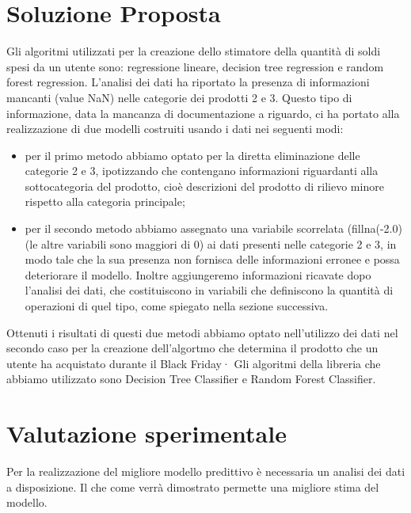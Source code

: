 \documentclass{article}
\begin{document}
\section{Soluzione Proposta}
Gli algoritmi utilizzati per la creazione dello stimatore della quantità di soldi spesi da un utente sono: regressione lineare, decision tree regression e random forest regression.
L'analisi dei dati ha riportato la presenza di informazioni mancanti (value NaN) nelle categorie dei prodotti 2 e 3. Questo tipo di informazione, data la mancanza di documentazione a riguardo, ci ha portato alla realizzazione di due modelli costruiti usando i dati nei seguenti modi:
\begin{itemize}
\item per il primo metodo abbiamo optato per la diretta eliminazione delle categorie 2 e 3, ipotizzando che contengano informazioni riguardanti alla sottocategoria del prodotto, cioè descrizioni del prodotto di rilievo minore rispetto alla categoria principale;
\item per il secondo metodo abbiamo assegnato una variabile scorrelata (fillna(-2.0) (le altre variabili sono maggiori di 0) ai dati presenti nelle categorie 2 e 3, in modo tale che la sua presenza non fornisca delle informazioni erronee e possa deteriorare il modello. Inoltre aggiungeremo informazioni ricavate dopo l'analisi dei dati, che costituiscono in variabili che definiscono la quantità di operazioni di quel tipo, come spiegato nella sezione successiva.
\end{itemize}

Ottenuti i risultati di questi due metodi abbiamo optato nell'utilizzo dei dati nel secondo caso per la creazione dell'algortmo che determina il prodotto che un utente ha acquistato durante il Black Friday· Gli algoritmi della libreria che abbiamo utilizzato sono Decision Tree Classifier e  Random Forest Classifier.

\section{Valutazione sperimentale}
Per la realizzazione del migliore modello predittivo è necessaria un analisi dei dati a disposizione. Il che come verrà dimostrato permette una migliore stima  del modello.
\end{document}
